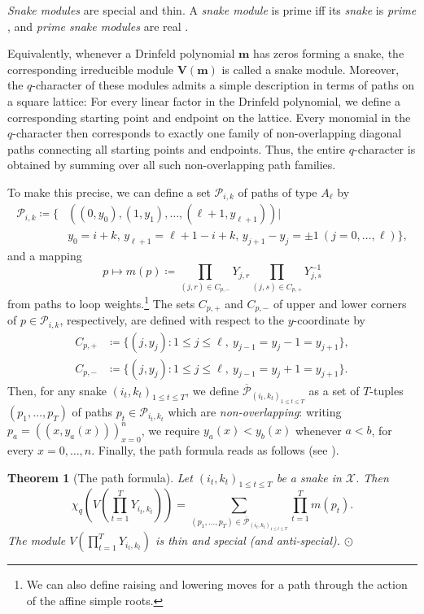 \documentclass[12pt,reqno]{amsart}
\numberwithin{equation}{section}
\newtheorem{thm}{Theorem}[section]
\begin{document}
{\textit{Snake modules}} are  {special} and {thin}.
A {\textit{snake module}} is {prime} iff its \textit{snake} is \textit{{prime}}
\cite[Theorem~3.3]{DuanLiLuo2019}, and
{\textit{prime snake modules}} are {real}
\cite[Theorem~3.4]{DuanLiLuo2019}.

Equivalently, whenever a {Drinfeld polynomial} $\boldsymbol{m}$ has zeros forming a snake, the corresponding irreducible module $\boldsymbol{V(m)}$ is called a {snake module}. Moreover, the $q$-character of these modules admits a simple description in terms of paths on a square lattice: For every linear factor in the Drinfeld polynomial, we define a corresponding starting point and endpoint on the lattice. Every monomial in the $q$-character then corresponds to exactly one family of non-overlapping {diagonal paths} connecting all starting points and endpoints. Thus, the entire $q$-character is obtained by summing over all such non-overlapping path families.

To make this precise, we can define a {set} $\mathcal{P}_{i,k}$ {of} {paths} of type $A_\ell$ by
\begin{equation*}
	\begin{split}
		\mathcal{P}_{i,k}\coloneq \{&((0,y_0),(1,y_1),\dots,(\ell+1,y_{\ell+1}))|\\
		&y_0=i+k,\, y_{\ell+1}=\ell+1-i+k,\, y_{j+1}-y_j=\pm1\ (j=0,\ldots,\ell)\},
	\end{split}
\end{equation*}
and a mapping $$p\mapsto m(p)\coloneq \prod_{(j,r)\in C_{p,-}}Y_{j,r}\prod_{(j,s)\in C_{p,+}}Y_{j,s}^{-1}$$ from paths to loop weights.\footnote{We can also define {raising} and {lowering moves} for a path through the {action} of the {affine simple roots}.}
The sets $C_{p,+}$ and $C_{p,-}$ of upper and lower corners of $p\in\mathcal{P}_{i,k}$, respectively, are defined with respect to the $y$-coordinate by
\begin{equation*}
    \begin{aligned}
        C_{p,+}&\coloneqq\{(j,y_j):1\leq j\leq\ell,\ y_{j-1}=y_j-1=y_{j+1}\},\\
        C_{p,-}&\coloneqq\{(j,y_j):1\leq j\leq\ell,\ y_{j-1}=y_j+1=y_{j+1}\}.
    \end{aligned}
\end{equation*}
Then, for any {snake} $(i_t,k_t)_{1\leq t\leq T}$, we define $\overline{\mathcal{P}}_{(i_t,k_t)_{1\leq t\leq T}}$ as a set of $T$-tuples $(p_1,\dots,p_T)$ of {paths} $p_t\in \mathcal{P}_{i_t,k_t}$ which are \textit{non-overlapping}: writing
$p_a=((x,y_a(x)))_{x=0}^{n}$, we require
$y_a(x)<y_b(x)$ whenever $a<b$, for every $x=0,\ldots,n$.
Finally, the path formula reads as follows (see \cite{MY2}).
\begin{thm}[The path formula]
	Let $(i_t,k_t)_{1\leq t\leq T}$ be a snake in $\mathcal{X}$. Then
	\begin{equation*}
		\chi_q\left(V\left(\prod_{t=1}^{T}Y_{i_t,k_t}\right)\right) = \sum_{(p_1,\dots,p_T)\in\overline{\mathcal{P}}_{(i_t,k_t)_{1\leq t\leq T}}}\prod_{t=1}^T m(p_t).
	\end{equation*}
	The module $V\left(\prod_{t=1}^{T}Y_{i_t,k_t}\right)$ is {thin} and {special} (and anti-special). $\odot$
	\label{thm:path_formula}
\end{thm}
\end{document}
